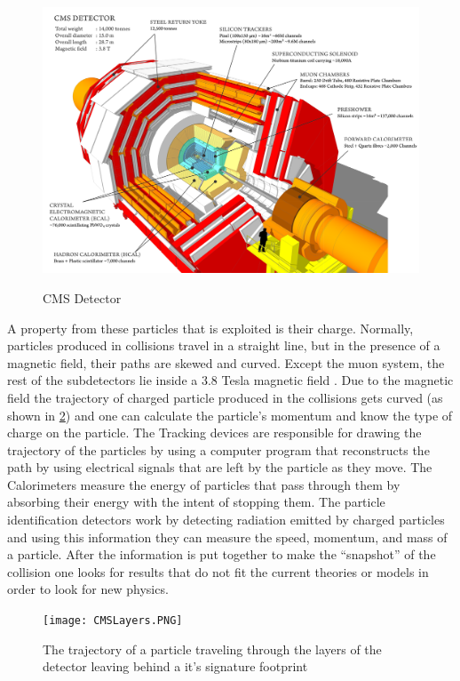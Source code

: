 \begin{figure}
\includegraphics[width=\linewidth]{CMSLayout.PNG}
\label{CMS_Dectector}
\caption{CMS Detector}
\end{figure}

A property from these particles that is exploited is their charge. Normally, particles produced in collisions travel in a straight line, but in the presence of a magnetic field, their paths are skewed and curved. Except the muon system, the rest of the subdetectors lie inside a 3.8 Tesla magnetic field . Due to the magnetic field the trajectory of charged particle produced in the collisions gets curved  (as shown in \ref{CMSLayers}) and one can calculate the particle’s momentum and know the type of charge on the particle.  The Tracking devices are responsible for drawing the trajectory of the particles by using a computer program that reconstructs the path by using electrical signals that are left by the particle as they move.  The Calorimeters measure the energy of particles that pass through them by absorbing their energy with the intent of stopping them. The particle identification detectors work by detecting radiation emitted by charged particles and using this information they can measure the speed, momentum, and mass of a particle. After the information is put together to make the “snapshot” of the collision one looks for results that do not fit the current theories or models in order to look for new physics.

\begin{figure}
\texttt{[image: CMSLayers.PNG]}
\label{CMSLayers}
\caption{The trajectory of a particle traveling through the layers of the detector leaving behind a it's signature footprint}
\end{figure}


